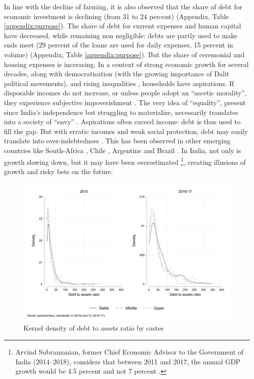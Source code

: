 \documentclass[a4paper, 11pt, onecolumn]{article}
\begin{document}
In line with the decline of farming, it is also observed that the share of debt for economic investment is declining (from 31 to 24 percent) (Appendix, Table \ref{appendix:purpose}). 
The share of debt for current expenses and human capital have decreased, while remaining non negligible: debts are partly used to make ends meet (29 percent of the loans are used for daily expenses, 15 percent in volume) (Appendix, Table \ref{appendix:purpose}). 
But the share of ceremonial and housing expenses is increasing. 
In a context of strong economic growth for several decades, along with democratisation (with the growing importance of Dalit political movements), and rising inequalities \citep{Chancel2019}, households have aspirations. 
If disposable incomes do not increase, or unless people adopt an ``ascetic morality'', they experience subjective impoverishment \citep[p.33]{Servet2013}. The very idea of ``equality'', present since India's independence but struggling to materialize, necessarily translates into a society of ``envy'' \citep{Dupuy2014}. 
Aspirations often exceed income: debt is thus used to fill the gap. 
But with erratic incomes and weak social protection, debt may easily translate into over-indebtedness \citep{Servet2013}. 
This has been observed in other emerging countries like South-Africa \citep{James2015}, Chile \citep{Han2012, Gonzalez2015}, Argentine \citep{Saiag2020} and Brazil \citep{Lavinas2017}. 
In India, not only is growth slowing down, but it may have been overestimated \citep{Subramanian2019}\footnote{Arvind Subramanian, former Chief Economic Advisor to the Government of India (2014–2018), considers that between 2011 and 2017, the annual GDP growth would be 4.5 percent and not 7 percent \citep{Subramanian2019}.}, creating illusions of growth and risky bets on the future. 



\begin{figure}[h!]
\center
\includegraphics[width=12cm]{DAR_caste.png}
\caption{Kernel density of debt to assets ratio by castes}
\label{kernel:DARcastes}
\end{figure}
\end{document}
